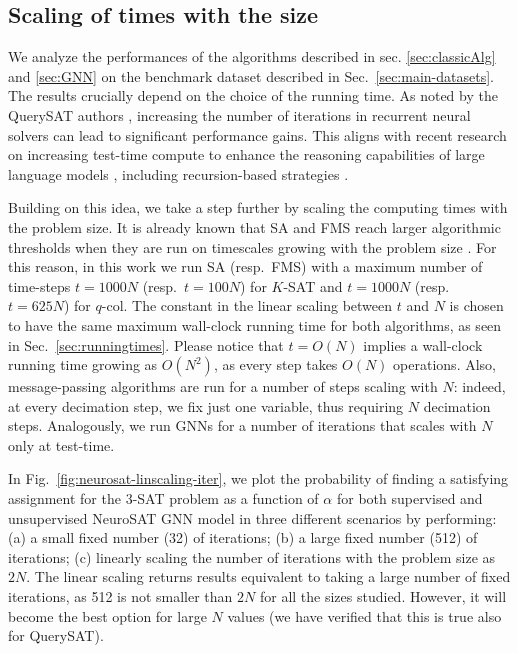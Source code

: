 \documentclass{article}
\begin{document}
\subsection{Scaling of times with the size}

We analyze the performances of the algorithms described in sec. \ref{sec:classicAlg} and \ref{sec:GNN} on the benchmark dataset described in Sec.~\ref{sec:main-datasets}. The results crucially depend on the choice of the running time. As noted by the QuerySAT authors \cite{ozolins_goal-aware_2022}, increasing the number of iterations in recurrent neural solvers can lead to significant performance gains. This aligns with recent research on increasing test-time compute to enhance the reasoning capabilities of large language models \cite{snell2024scaling}, including recursion-based strategies \cite{geiping2025scalingtesttimecomputelatent}. 

Building on this idea, we take a step further by scaling the computing times with the problem size.
It is already known that SA and FMS reach larger algorithmic thresholds when they are run on timescales growing with the problem size \cite{angelini2025algorithmic}. For this reason, in this work we run SA (resp.~FMS) with a maximum number of time-steps $t=1000N$ (resp.~$t=100N$) for $K$-SAT and $t=1000N$ (resp.~$t=625N$) for $q$-col. The constant in the linear scaling between $t$ and $N$ is chosen to have the same maximum wall-clock running time for both algorithms, as seen in Sec.~\ref{sec:runningtimes}. Please notice that $t=O(N)$ implies a wall-clock running time growing as $O(N^2)$, as every step takes $O(N)$ operations. Also, message-passing algorithms are run for a number of steps scaling with $N$: indeed, at every decimation step, we fix just one variable, thus requiring $N$ decimation steps. Analogously, we run GNNs for a number of iterations that scales with $N$ only at test-time.

In Fig.~\ref{fig:neurosat-linscaling-iter}, we plot the probability of finding a satisfying assignment for the 3-SAT problem as a function of $\alpha$ for both supervised and unsupervised NeuroSAT GNN model in three different scenarios by performing: (a) a small fixed number (32) of iterations; (b) a large fixed number (512) of iterations; (c) linearly scaling the number of iterations with the problem size as $2N$. The linear scaling returns results equivalent to taking a large number of fixed iterations, as 512 is not smaller than $2N$ for all the sizes studied. However, it will become the best option for large $N$ values (we have verified that this is true also for QuerySAT).
\end{document}
